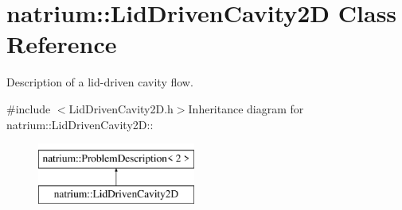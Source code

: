 \hypertarget{classnatrium_1_1LidDrivenCavity2D}{
\section{natrium::LidDrivenCavity2D Class Reference}
\label{classnatrium_1_1LidDrivenCavity2D}
}


Description of a lid-\/driven cavity flow.  


{\ttfamily \#include $<$LidDrivenCavity2D.h$>$}Inheritance diagram for natrium::LidDrivenCavity2D::\begin{figure}[H]
\begin{center}
\leavevmode
\includegraphics[height=2cm]{classnatrium_1_1LidDrivenCavity2D}
\end{center}
\end{figure}
